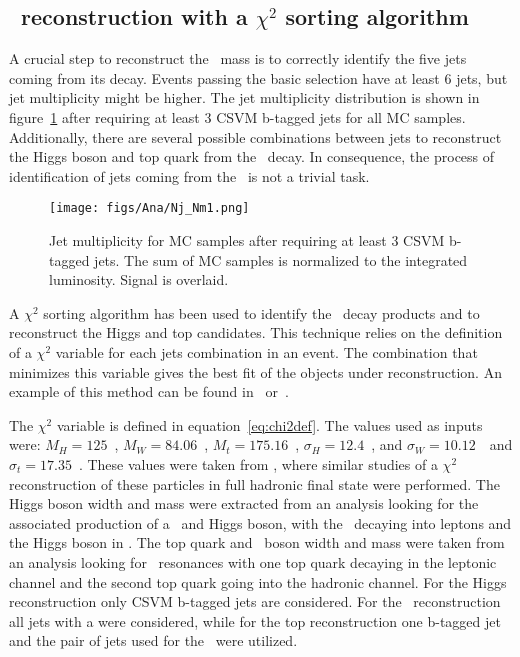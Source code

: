 \subsection{\Tp~reconstruction with a $\chi^{2}$ sorting algorithm}
\label{sec:chi2}

A crucial step to reconstruct the \Tp~mass is to correctly identify the five jets coming from its decay. Events passing the basic selection have at least 6 jets, but jet multiplicity might be higher. The jet multiplicity distribution is shown in figure~\ref{fig:Nj} after requiring at least 3 CSVM b-tagged jets for all MC samples. Additionally, there are several possible combinations between jets to reconstruct the Higgs boson and top quark from the \Tp~decay. In consequence, the process of identification of jets coming from the \Tp~is not a trivial task. 

\begin{figure}[!Hhtbp]
  \begin{center}
    \texttt{[image: figs/Ana/Nj\_Nm1.png]}
    \caption{Jet multiplicity for MC samples after requiring at least 3 CSVM b-tagged jets. The sum of MC samples is normalized to the integrated luminosity. Signal is overlaid.}
    \label{fig:Nj}
  \end{center}
\end{figure}

A $\chi^{2}$ sorting algorithm has been used to identify the \Tp~decay products and to reconstruct the Higgs and top candidates. This technique relies on the definition of a $\chi^{2}$ variable for each jets combination in an event. The combination that minimizes this variable gives the best fit of the objects under reconstruction. An example of this method can be found in~\cite{Chatrchyan:2014gma} or~\cite{Brochet:1956723}. 

The $\chi^{2}$ variable is defined in equation~\ref{eq:chi2def}. The values used as inputs were: $M_{H}=125$~\GeVcc, $M_{W}=84.06$~\GeVcc, $M_{t}=175.16$~\GeVcc, $\sigma_{H}=12.4$~\GeVcc, and $\sigma_{W}=10.12$~\GeVcc~and $\sigma_{t}=17.35$~\GeVcc. These values were taken from \cite{Brochet:1956723,Chatrchyan:2013zna}, where similar studies of a $\chi^{2}$ reconstruction of these particles in full hadronic final state were performed. The Higgs boson width and mass were extracted from an analysis looking for the associated production of a \Z~and Higgs boson, with the \Z~decaying into leptons and the Higgs boson in \bbbar. The top quark and \W~boson width and mass were taken from an analysis looking for \ttbar~resonances with one top quark decaying in the leptonic channel and the second top quark going into the hadronic channel. For the Higgs reconstruction only CSVM b-tagged jets are considered. For the \W~reconstruction all jets with a  were considered, while for the top reconstruction one b-tagged jet and the pair of jets used for the \W~were utilized. %


